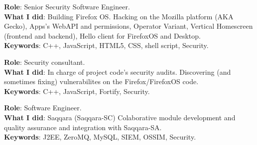 \documentclass[]{resume}
\begin{document}
\begin{minipage}[t]{0.66\textwidth}
\textbf{Role}: Senior Security Software Engineer.\\
\textbf{What I did}: Building Firefox OS. Hacking on the Mozilla platform (AKA Gecko), Apps's WebAPI and permissions, Operator Variant, Vertical Homescreen (frontend and backend), Hello client for FirefoxOS and Desktop.\\
\textbf{Keywords}: C++, JavaScript, HTML5, CSS, shell script, Security.
\sectionsep

\textbf{Role}: Security consultant.\\
\textbf{What I did}: In charge of project code's security audits. Discovering (and sometimes fixing) vulnerabilites on the Firefox/FirefoxOS code.\\
\textbf{Keywords}: C++, JavaScript, Fortify, Security.
\sectionsep

\textbf{Role}: Software Engineer.\\
\textbf{What I did}: Saqqara (Saqqara-SC) Colaborative module development and quality assurance and integration with Saqqara-SA.\\
\textbf{Keywords}: J2EE, ZeroMQ, MySQL, SIEM, OSSIM, Security.
\sectionsep

\end{minipage}
\hfill
\end{document}

